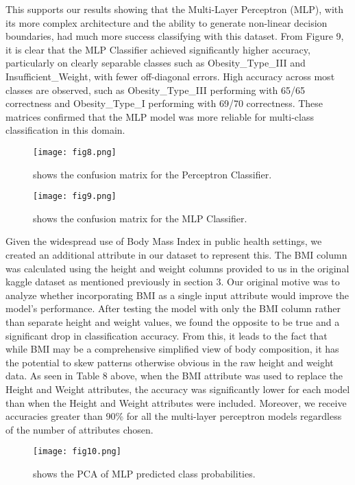 \documentclass[conference]{IEEEtran}
\begin{document}
This supports our results showing that the Multi-Layer Perceptron (MLP), with its more complex architecture and the ability to generate non-linear decision boundaries, had much more success classifying with this dataset.  From Figure 9, it is clear that the MLP Classifier achieved significantly higher accuracy, particularly on clearly separable classes such as Obesity\_Type\_III and Insufficient\_Weight, with fewer off-diagonal errors. High accuracy across most classes are observed, such as Obesity\_Type\_III performing with 65/65 correctness and Obesity\_Type\_I performing with 69/70 correctness. These matrices confirmed that the MLP model was more reliable for multi-class classification in this domain.

\begin{figure}[htbp]
\centering
\texttt{[image: fig8.png]}
\caption{shows the confusion matrix for the Perceptron Classifier.}
\label{Table 3.1}
\end{figure}
\begin{figure}[htbp]
\centering
\texttt{[image: fig9.png]}
\caption{shows the confusion matrix for the MLP Classifier.}
\label{Table 3.1}
\end{figure}

Given the widespread use of Body Mass Index in public health settings, we created an additional attribute in our dataset to represent this. The BMI column was calculated using the height and weight columns provided to us in the original kaggle dataset as mentioned previously in section 3. Our original motive was to analyze whether incorporating BMI as a single input attribute would improve the model’s performance. After testing the model with only the BMI column rather than separate height and weight values, we found the opposite to be true and a significant drop in classification accuracy. From this, it leads to the fact that while BMI may be a comprehensive simplified view of body composition, it has the potential to skew patterns otherwise obvious in the raw height and weight data. As seen in Table 8 above, when the BMI attribute was used to replace the Height and Weight attributes, the accuracy was significantly lower for each model than when the Height and Weight attributes were included. Moreover, we receive accuracies greater than 90\% for all the multi-layer perceptron models regardless of the number of attributes chosen.

\begin{figure}[htbp]
\centering
\texttt{[image: fig10.png]}
\caption{shows the PCA of MLP predicted class probabilities.}
\label{Table 3.1}
\end{figure}
\end{document}
